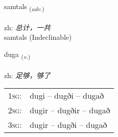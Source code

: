 \documentclass[frontgrid, backgrid]{flacards}\usepackage[]{graphicx}\usepackage[]{color}
\begin{document}

\renewcommand{\flhead}{\vskip5pt \fboxsep=0pt {\small\bfseries\footnotesize Atviksorð | 副词}}
\renewcommand{\fcfoot}{\vskip5pt \fboxsep=0pt \hspace{2pt}{\small\bfseries\footnotesize 2K}}

\renewcommand{\blhead}{\vskip5pt {\small\bfseries\footnotesize Atviksorð | 副词 }}
\renewcommand{\bcfoot}{\vskip5pt \hspace{2pt}{\small\bfseries\footnotesize 2K}}


{samtals \small{\textsubscript{(\textit{adv.})}} \\[1ex]
\textphonetic{[samtʰals]} \\
zh: \emph{总计，一共} \\  [2ex]
samtals (Indeclinable)}

\renewcommand{\flhead}{\vskip5pt \fboxsep=0pt {\small\bfseries\footnotesize Sagnorð | 动词}}
\renewcommand{\fcfoot}{\vskip5pt \fboxsep=0pt \hspace{2pt}{\small\bfseries\footnotesize 2K}}

\renewcommand{\blhead}{\vskip5pt {\small\bfseries\footnotesize Sagnorð | 动词 }}
\renewcommand{\bcfoot}{\vskip5pt \hspace{2pt}{\small\bfseries\footnotesize 2K}}


{duga \small{\textsubscript{(\textit{v.})}} \\[1ex] %
\textphonetic{[tʏːɣa]} \\
zh: \emph{足够，够了} \\  [2ex]
\renewcommand*{\arraystretch}{0.8}
\begin{tabular}{p{1cm}l}
\textsc{1sg}: & dugi -- dugði -- dugað \\ 
\textsc{2sg}: & dugir -- dugðir -- dugað \\ 
\textsc{3sg}: & dugir -- dugði -- dugað \\ 
\end{tabular}
}

\renewcommand{\flhead}{\vskip5pt \fboxsep=0pt {\small\bfseries\footnotesize Sagnorð | 动词}}
\renewcommand{\fcfoot}{\vskip5pt \fboxsep=0pt \hspace{2pt}{\small\bfseries\footnotesize 2K}}
\end{document}
